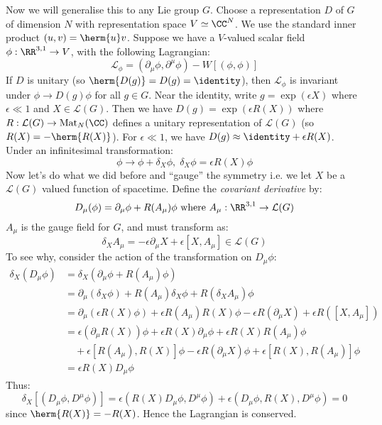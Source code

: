 \documentclass{jknotes}
\begin{document}
Now we will generalise this to any Lie group \(G\). Choose a representation \(D\) of \(G\) of dimension \(N\) with representation space \(V\simeq\CC^N\). We use the standard inner product \((u,v) = \herm{u}v\). Suppose we have a \(V\)-valued scalar field \(\phi:\RR^{3,1} \rightarrow V\), with the following Lagrangian:
\begin{equation}
    \mathcal{L}_\phi = (\partial_\mu\phi,\partial^\mu\phi) - W[(\phi,\phi)]
\end{equation}
If \(D\) is unitary (so \(\herm{D(g)} = D(g) = \identity\)), then \(\mathcal{L}_\phi\) is invariant under \(\phi \rightarrow D(g)\phi\) for all \(g \in G\). Near the identity, write \(g = \exp(\epsilon X)\) where \(\epsilon \ll 1\) and \(X \in \mathcal{L}(G)\). Then we have \(D(g) = \exp(\epsilon R(X))\) where \(R:\mathcal{L}(G)\rightarrow \operatorname{Mat}_N(\CC)\) defines a unitary representation of \(\mathcal{L}(G)\) (so \(R(X) = -\herm{R(X)}\)). For \(\epsilon \ll 1\), we have \(D(g) \approx \identity + \epsilon R(X)\). Under an infinitesimal transformation:
\begin{equation}
    \phi \rightarrow \phi + \delta_X\phi,\;\delta_X\phi = \epsilon R(X)\phi
\end{equation}
Now let's do what we did before and ``gauge'' the symmetry i.e. we let \(X\) be a \(\mathcal{L}(G)\) valued function of spacetime. Define the \emph{covariant derivative} by:
\begin{equation}
    D_\mu(\phi) = \partial_\mu\phi + R(A_\mu)\phi \text{ where } A_\mu:\RR^{3,1} \rightarrow \mathcal{L}(G)
\end{equation}
\(A_\mu\) is the gauge field for \(G\), and must transform as:
\begin{equation}
    \delta_XA_\mu = -\epsilon \partial_\mu X + \epsilon [X,A_\mu] \in \mathcal{L}(G)
\end{equation}
To see why, consider the action of the transformation on \(D_\mu \phi\):
\begin{align}
    \delta_X(D_\mu\phi) &= \delta_X(\partial_\mu\phi + R(A_\mu)\phi) \\
    &= \partial_\mu (\delta_X\phi) + R(A_\mu)\delta_X\phi + R(\delta_XA_\mu)\phi \\
    &= \partial_\mu (\epsilon R(X)\phi) + \epsilon R(A_\mu)R(X)\phi - \epsilon R(\partial_\mu X) + \epsilon R([X,A_\mu]) \\
    &= \epsilon(\partial_\mu R(X)) \phi + \epsilon R(X) \partial_\mu\phi + \epsilon R(X)R(A_\mu)\phi \\
    &\quad + \epsilon[R(A_\mu),R(X)]\phi - \epsilon R(\partial_\mu X)\phi + \epsilon[R(X),R(A_\mu)] \phi \\
    &= \epsilon R(X)D_\mu\phi
\end{align}
Thus:
\begin{equation}
    \delta_X[(D_\mu\phi,D^\mu\phi)] = \epsilon (R(X)D_\mu\phi,D^\mu\phi) + \epsilon (D_\mu\phi,R(X),D^\mu\phi) = 0
\end{equation}
since \(\herm{R(X)} = -R(X)\). Hence the Lagrangian is conserved.
\end{document}
